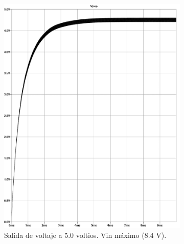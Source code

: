 \begin{figure}[h]
  \centering
  \begin{subfigure}{0.48\linewidth}
    \includegraphics[width=\textwidth]{Pictures/Convertidor DC-DC MC34063A, 2s2p, bus 5.0 v a 500 mA_page-0001 Max.jpg}
    \caption{Salida de voltaje a 5.0 voltios. Vin máximo (8.4 V).}
    \label{fig:2s2p_50v_2dcdcconverters_Max}
  \end{subfigure}
  \hfill
  \begin{subfigure}{0.48\linewidth}

\end{subfigure}
\end{figure}
